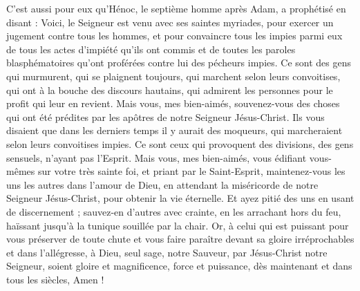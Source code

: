 \begin{multicols}{2}
C’est aussi pour eux qu’Hénoc, le septième homme après Adam, a prophétisé en disant :
Voici, le Seigneur est venu avec ses saintes myriades, pour exercer un jugement contre tous les hommes, et pour convaincre tous les impies parmi eux de tous les actes d'impiété qu’ils ont commis et de toutes les paroles blasphématoires qu’ont proférées contre lui des pécheurs impies.
Ce sont des gens qui murmurent, qui se plaignent toujours, qui marchent selon leurs convoitises, qui ont à la bouche des discours hautains, qui admirent les personnes pour le profit qui leur en revient.
Mais vous, mes bien-aimés, souvenez-vous des choses qui ont été prédites par les apôtres de notre Seigneur Jésus-Christ.
Ils vous disaient que dans les derniers temps il y aurait des moqueurs, qui marcheraient selon leurs convoitises impies.
Ce sont ceux qui provoquent des divisions, des gens sensuels, n'ayant pas l'Esprit.
Mais vous, mes bien-aimés, vous édifiant vous-mêmes sur votre très sainte foi, et priant par le Saint-Esprit,
maintenez-vous les uns les autres dans l'amour de Dieu, en attendant la miséricorde de notre Seigneur Jésus-Christ, pour obtenir la vie éternelle.
Et ayez pitié des uns en usant de discernement ;
sauvez-en d’autres avec crainte, en les arrachant hors du feu, haïssant jusqu’à la tunique souillée par la chair.
\TextTitle{[Conclusion]}
Or, à celui qui est puissant pour vous préserver de toute chute et vous faire paraître devant sa gloire irréprochables et dans l’allégresse,
à Dieu, seul sage, notre Sauveur, par Jésus-Christ notre Seigneur, soient gloire et magnificence, force et puissance, dès maintenant et dans tous les siècles, Amen !
\PPE{}
\end{multicols}
